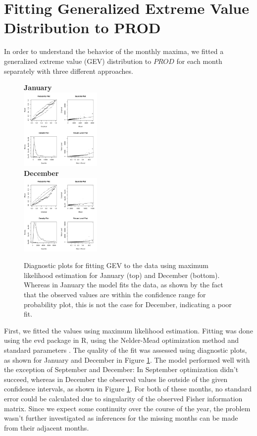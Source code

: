 \documentclass[10pt,conference,compsocconf]{IEEEtran}
\begin{document}
\section*{Fitting Generalized Extreme Value Distribution to PROD}
In order to understand the behavior of the monthly maxima, we fitted a generalized extreme value (GEV) distribution to $PROD$ for each month separately with three different approaches. 
\begin{figure}
	\centering
	\textbf{January}\\
	\includegraphics[width=0.35\textwidth]{../plots/monthly_mle_diag/01_monthly_mle_diag.pdf}\\
	\textbf{December}\\
	\includegraphics[width=0.35\textwidth]{../plots/monthly_mle_diag/12_monthly_mle_diag.pdf}
	\caption{Diagnostic plots for fitting GEV to the data using maximum likelihood estimation for January (top) and December (bottom). Whereas in January the model fits the data, as shown by the fact that the observed values are within the confidence range for probability plot, this is not the case for December, indicating a poor fit.}
	\label{fig:mle_diag}
\end{figure}
\par
First, we fitted the values using maximum likelihood estimation. Fitting was done using the evd package in R, using the Nelder-Mead optimization method and standard parameters \cite{evd}. The quality of the fit was assessed using diagnostic plots, as shown for January and December in Figure \ref{fig:mle_diag}. The model performed well with the exception of September and December: In September optimization didn't succeed, whereas in December the observed values lie outside of the given confidence intervals, as shown in Figure \ref{fig:mle_diag}. For both of these months, no standard error could be calculated due to singularity of the observed Fisher information matrix. Since we expect some continuity over the course of the year, the problem wasn't further investigated as inferences for the missing months can be made from their adjacent months. 
\par
\end{document}

